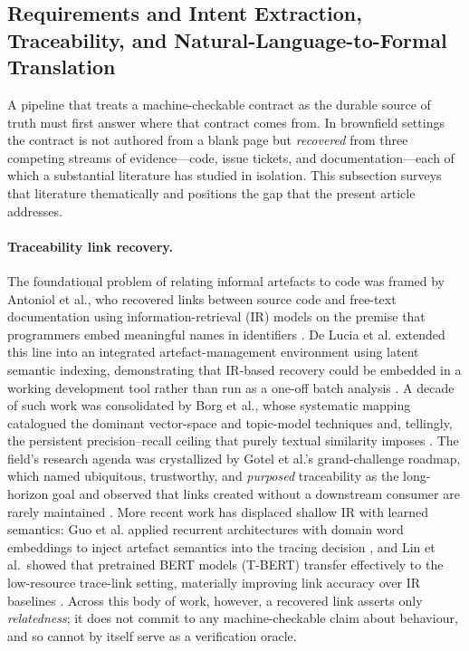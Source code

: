 \subsection{Requirements and Intent Extraction, Traceability, and Natural-Language-to-Formal Translation}
\label{subsec:rw9}

A pipeline that treats a machine-checkable contract as the durable source of truth must first answer where that contract comes from. In brownfield settings the contract is not authored from a blank page but \emph{recovered} from three competing streams of evidence---code, issue tickets, and documentation---each of which a substantial literature has studied in isolation. This subsection surveys that literature thematically and positions the gap that the present article addresses.

\paragraph{Traceability link recovery.}
The foundational problem of relating informal artefacts to code was framed by Antoniol et al., who recovered links between source code and free-text documentation using information-retrieval (IR) models on the premise that programmers embed meaningful names in identifiers \cite{antoniol2002recovering}. De Lucia et al. extended this line into an integrated artefact-management environment using latent semantic indexing, demonstrating that IR-based recovery could be embedded in a working development tool rather than run as a one-off batch analysis \cite{delucia2007recovering}. A decade of such work was consolidated by Borg et al., whose systematic mapping catalogued the dominant vector-space and topic-model techniques and, tellingly, the persistent precision--recall ceiling that purely textual similarity imposes \cite{borg2014recovering}. The field's research agenda was crystallized by Gotel et al.'s grand-challenge roadmap, which named ubiquitous, trustworthy, and \emph{purposed} traceability as the long-horizon goal and observed that links created without a downstream consumer are rarely maintained \cite{gotel2012grand}. More recent work has displaced shallow IR with learned semantics: Guo et al. applied recurrent architectures with domain word embeddings to inject artefact semantics into the tracing decision \cite{guo2017semantic}, and Lin et al.\ showed that pretrained BERT models (T-BERT) transfer effectively to the low-resource trace-link setting, materially improving link accuracy over IR baselines \cite{lin2021tbert}. Across this body of work, however, a recovered link asserts only \emph{relatedness}; it does not commit to any machine-checkable claim about behaviour, and so cannot by itself serve as a verification oracle.

